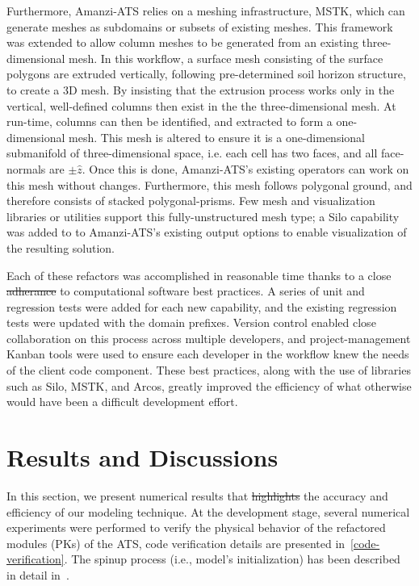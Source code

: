 \documentclass[review,11pt]{elsarticle}
\providecommand{\DIFadd}[1]{{\protect\color{blue}\uwave{#1}}} %
\providecommand{\DIFdel}[1]{{\protect\color{red}\sout{#1}}}                      %
\providecommand{\DIFaddbegin}{} %
\providecommand{\DIFaddend}{} %
\providecommand{\DIFdelbegin}{} %
\providecommand{\DIFdelend}{} %
\begin{document}
Furthermore, Amanzi-ATS relies on a meshing infrastructure, MSTK, \cite{garimella-2014-mstk}  which can generate meshes as subdomains or subsets of existing meshes.
This framework was extended to allow column meshes to be generated from an existing three-dimensional mesh.
In this workflow, a surface mesh consisting of the surface polygons are extruded vertically, following pre-determined soil horizon structure, to create a 3D mesh.
By insisting that the extrusion process works only in the vertical, well-defined columns then exist in the the three-dimensional mesh.
At run-time, columns can then be identified, and extracted to form a one-dimensional mesh.
This mesh is altered to ensure it is a one-dimensional submanifold of three-dimensional space, i.e. each cell has two faces, and all face-normals are $\pm \hat{z}$.
Once this is done, Amanzi-ATS's existing operators can work on this mesh without changes.
Furthermore, this mesh follows polygonal ground, and therefore consists of stacked polygonal-prisms.
Few mesh and visualization libraries or utilities support this fully-unstructured mesh type; a Silo\cite{silo} capability was added to to Amanzi-ATS's existing output options to enable visualization of the resulting solution.

Each of these refactors was accomplished in reasonable time thanks to a close \DIFdelbegin \DIFdel{adherance }\DIFdelend \DIFaddbegin \DIFadd{adherence }\DIFaddend to computational software best practices.
A series of unit and regression tests were added for each new capability, and the existing regression tests were updated with the domain prefixes.
Version control enabled close collaboration on this process across multiple developers, and project-management Kanban tools were used to ensure each developer in the workflow knew the needs of the client code component.
These best practices, along with the use of libraries such as Silo, MSTK, and Arcos, greatly improved the efficiency of what otherwise would have been a difficult development effort.

\section{Results and Discussions}\label{numerical-tests}

In this section, we present numerical results that \DIFdelbegin \DIFdel{highlights }\DIFdelend \DIFaddbegin \DIFadd{highlight }\DIFaddend the accuracy and efficiency of our modeling technique. At the development stage, several numerical experiments were performed to verify the physical behavior of the refactored modules (PKs) of the ATS, code verification details are presented in~\ref{code-verification}. The spinup process (i.e., model's initialization) has been described in detail in~\cite{spainter2016integrated}. 
\end{document}
